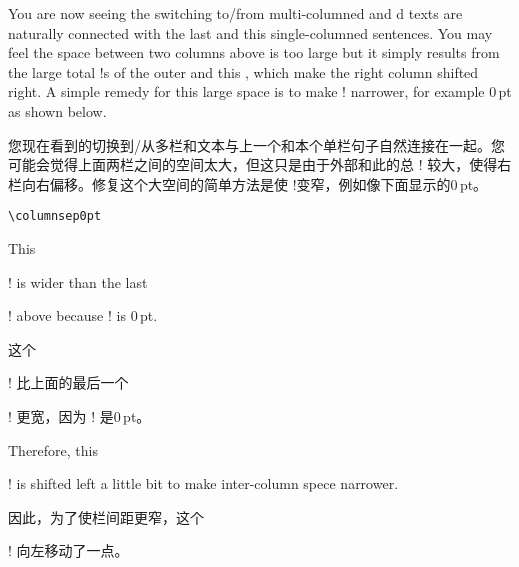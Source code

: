 \begin{description}
\begin{itemize}
\begin{paracol}{2}
\end{paracol}

You are now seeing the switching to/from multi-columned and d
texts are naturally connected with the last and this single-columned
sentences.  You may feel the space between two columns above is too large
but it simply results from the large total \!\leftmargin!s of the outer
 and this , which make the right column
shifted right.  A simple remedy for this large space is to make
\!\columnsep! narrower, for example 0\,pt as shown below.

您现在看到的切换到/从多栏和文本与上一个和本个单栏句子自然连接在一起。您可能会觉得上面两栏之间的空间太大，但这只是由于外部和此的总 \!\leftmargin! 较大，使得右栏向右偏移。修复这个大空间的简单方法是使 \!\columnsep!变窄，例如像下面显示的0\,pt。

\begin{Verbatim}
\columnsep0pt
\end{Verbatim}

\begin{paracol}{2}
\item
This \!\item! is wider than the last \!\item! above because
\!\columnsep! is 0\,pt.

这个 \!\item! 比上面的最后一个 \!\item! 更宽，因为 \!\columnsep! 是0\,pt。
\switchcolumn

\item
Therefore, this \!\item! is shifted left a little bit to make
inter-column spece narrower.

因此，为了使栏间距更窄，这个 \!\item! 向左移动了一点。
\end{paracol}


\end{itemize}
\end{description}
